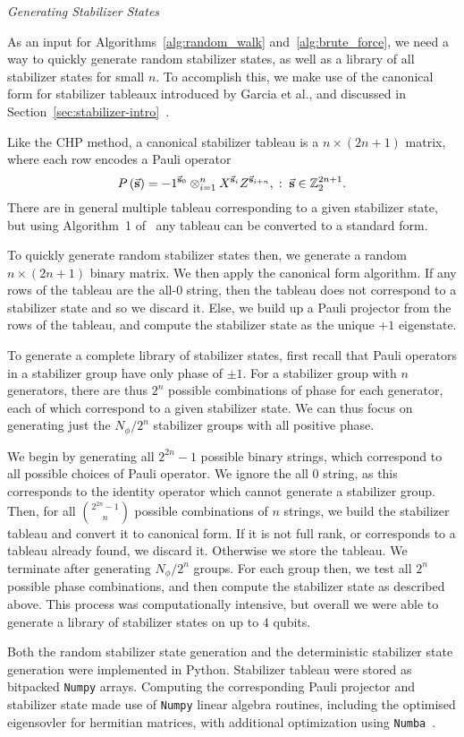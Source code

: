 \par\large{\itshape{Generating Stabilizer States}}\par
As an input for Algorithms~\ref{alg:random_walk} and~\ref{alg:brute_force}, we need a way to quickly generate random stabilizer states, as well as a library of all stabilizer states for small $n$. To accomplish this, we make use of the canonical form for stabilizer tableaux introduced by Garcia et al., and discussed in Section~\ref{sec:stabilizer-intro}~\cite{Garcia2012}.\par
Like the CHP method, a canonical stabilizer tableau is a $n \times \left(2n+1\right)$ matrix, where each row encodes a Pauli operator
\[P\left(\va{s}\right)=-1^{\va{s}_{0}}\otimes_{i=1}^{n}X^{\va{s}_{i}}Z^{\va{s}_{i+n}},\;:\;\va{s}\in\mathbb{Z}_{2}^{2n+1}.\]
There are in general multiple tableau corresponding to a given stabilizer state, but using Algorithm~1 of~\cite{Garcia2012} any tableau can be converted to a standard form.\par
To quickly generate random stabilizer states then, we generate a random $n \times \left(2n+1\right)$ binary matrix. We then apply the canonical form algorithm. If any rows of the tableau are the all-$0$ string, then the tableau does not correspond to a stabilizer state and so we discard it. Else, we build up a Pauli projector from the rows of the tableau, and compute the stabilizer state as the unique $+1$ eigenstate.\par
To generate a complete library of stabilizer states, first recall that Pauli operators in a stabilizer group have only phase of $\pm 1$. For a stabilizer group with $n$ generators, there are thus $2^{n}$ possible combinations of phase for each generator, each of which correspond to a given stabilizer state. We can thus focus on generating just the $N_{\phi}/2^{n}$ stabilizer groups with all positive phase.\par
We begin by generating all $2^{2n}-1$ possible binary strings, which correspond to all possible choices of Pauli operator. We ignore the all $0$ string, as this corresponds to the identity operator which cannot generate a stabilizer group. Then, for all $\binom{2^{2n}-1}{n}$ possible combinations of $n$ strings, we build the stabilizer tableau and convert it to canonical form. If it is not full rank, or corresponds to a tableau already found, we discard it. Otherwise we store the tableau. We terminate after generating $N_{\phi}/2^{n}$ groups. For each group then, we test all $2^{n}$ possible phase combinations, and then compute the stabilizer state as described above. This process was computationally intensive, but overall we were able to generate a library of stabilizer states on up to $4$ qubits.\par
Both the random stabilizer state generation and the deterministic stabilizer state generation were implemented in Python. Stabilizer tableau were stored as bitpacked \texttt{Numpy} arrays. Computing the corresponding Pauli projector and stabilizer state made use of \texttt{Numpy} linear algebra routines, including the optimised eigensovler for hermitian matrices, with additional optimization using \texttt{Numba}~\cite{Numpy,Numba}.
